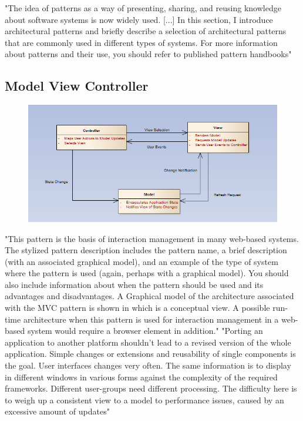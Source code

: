 "The idea of patterns as a way of presenting, sharing, and reusing knowledge about software systems is now widely used. [...] In this section, I introduce architectural patterns and briefly describe a selection of architectural patterns that are commonly used in different types of systems. For more information about patterns and their use, you should refer to published pattern handbooks" \citep{sommerville}
\subsection{Model View Controller}

\begin{figure}[!hbp]
\includegraphics[scale=0.85]{img/pics/mvc.PNG}
\caption{ \protect \cite{sommerville}}
\label{fig:ref_mvc}
\end{figure}


"This pattern is the basis of interaction management in many web-based systems. The stylized pattern description includes the pattern name, a brief description (with an associated graphical model), and an example of the type of system where the pattern is used (again, perhaps with a graphical model). You should also include information about when the pattern should be used and its advantages and disadvantages. A Graphical model of the architecture associated with the MVC pattern is shown in  which is a conceptual view. A possible run-time architecture when this pattern is used for interaction management in a web-based system would require a browser element in addition." \citep{sommerville}
"Porting an application to another platform shouldn't lead to a revised version of the whole application. Simple changes or extensions and reusability of single components is the goal.
User interfaces changes very often. The same information is to display in different windows in various forms against the complexity of the required frameworks. Different user-groups need different processing.  The difficulty here is to weigh up a consistent view to a model to performance issues, caused by an excessive amount of updates" \citep{starke_rausch}
\vfill
